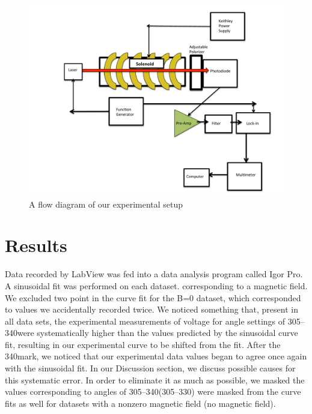 \documentclass[prb,preprint]{revtex4-1}
\begin{document}
\begin{figure}[b]
\includegraphics[width = 6.3in]{ExperimentalSetup}
\caption{\label{setup}A flow diagram of our experimental setup}
\end{figure}



\section{Results}
{Data recorded by LabView was fed into a data analysis program called Igor Pro.  A sinusoidal fit was performed on each dataset. corresponding to a magnetic field.  We excluded two point in the curve fit for the B=0 dataset, which corresponded to values we accidentally recorded twice. 
We noticed something that, present in all data sets, the experimental measurements of voltage for angle settings of 305\degree--340\degree were systematically higher than the values predicted by the sinusoidal curve fit, resulting in our experimental curve to be shifted from the fit.  After the 340\degree mark, we noticed that our experimental data values began to agree once again with the sinusoidal fit.  In our Discussion section, we discuss possible causes for this systematic error.  In order to eliminate it as much as possible, we masked the values corresponding to angles of 305\degree--340\degree(305\degree--330\degree) were masked from the curve fits as well for datasets with a nonzero magnetic field (no magnetic field).}
\end{document}
